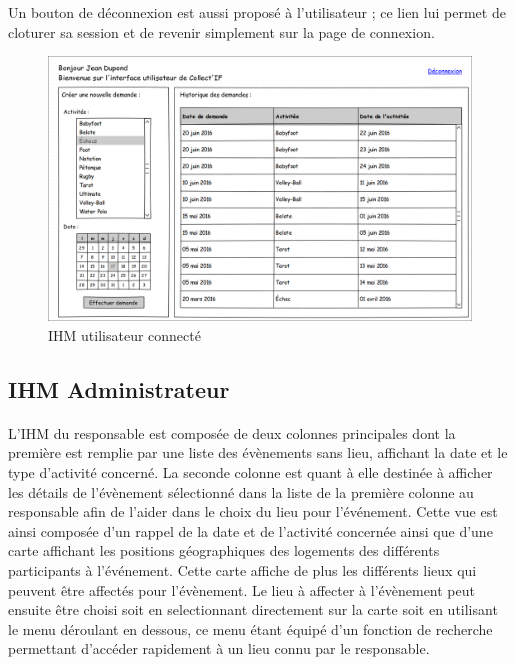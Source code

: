 \documentclass[a4paper,11pt]{article}
\begin{document}
Un bouton de déconnexion est aussi proposé à l'utilisateur ; ce lien lui permet de cloturer sa session et de revenir simplement sur la page de connexion.

\begin{figure}[H]
  \begin{center}
    \includegraphics[width=15cm]{../../IHM/IHM_utilisateur.png}
    \caption{IHM utilisateur connecté}
  \end{center}
\end{figure}

\pagebreak
\subsection{IHM Administrateur}

\paragraph{}
L'IHM du responsable est composée de deux colonnes principales dont la première est remplie par une liste des évènements sans lieu, affichant la date et le type d'activité concerné. La seconde colonne est quant à elle destinée à afficher les détails de l'évènement sélectionné dans la liste de la première colonne au responsable afin de l'aider dans le choix du lieu pour l'événement. Cette vue est ainsi composée d'un rappel de la date et de l'activité concernée ainsi que d'une carte affichant les positions géographiques des logements des différents participants à l'événement. Cette carte affiche de plus les différents lieux qui peuvent être affectés pour l'évènement. Le lieu à affecter à l'évènement peut ensuite être choisi soit en selectionnant directement sur la carte soit en utilisant le menu déroulant en dessous, ce menu étant équipé d'un fonction de recherche permettant d'accéder rapidement à un lieu connu par le responsable.
\end{document}
